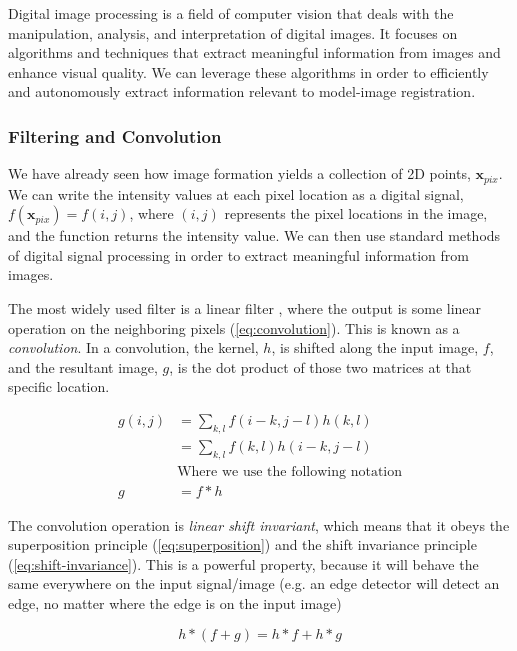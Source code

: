 Digital image processing is a field of computer vision that deals with the manipulation, analysis, and interpretation of digital images. It focuses on algorithms and techniques that extract meaningful information from images and enhance visual quality. We can leverage these algorithms in order to efficiently and autonomously extract information relevant to model-image registration.

\subsubsection{Filtering and Convolution}
\label{sec:filtering-convolution}
We have already seen how image formation yields a collection of 2D points, $\mathbf{x}_{pix}$. We can write the intensity values at each pixel location as a digital signal, $f(\mathbf{x}_{pix}) = f(i,j)$, where $(i,j)$ represents the pixel locations in the image, and the function returns the intensity value. We can then use standard methods of digital signal processing in order to extract meaningful information from images.

The most widely used filter is a linear filter \cite{szeliskiComputerVisionAlgorithms2022}, where the output is some linear operation on the neighboring pixels (\cref{eq:convolution}). This is known as a \emph{convolution}. In a convolution, the kernel, $h$, is shifted along the input image, $f$, and the resultant image, $g$, is the dot product of those two matrices at that specific location.

\begin{equation}
    \begin{aligned}
        g(i,j) &= \sum_{k,l}f(i-k,j-l)h(k,l) \\
        &= \sum_{k,l}f(k,l)h(i-k,j-l) \\
        &\text{Where we use the following notation}\\
        g&= f * h
    \end{aligned}
    \label{eq:convolution}
\end{equation}

The convolution operation is \emph{linear shift invariant}, which means that it obeys the superposition principle (\cref{eq:superposition}) and the shift invariance principle (\cref{eq:shift-invariance}). This is a powerful property, because it will behave the same everywhere on the input signal/image (e.g. an edge detector will detect an edge, no matter where the edge is on the input image)

\begin{equation}
    h *(f + g) = h*f + h*g
    \label{eq:superposition}
\end{equation}

